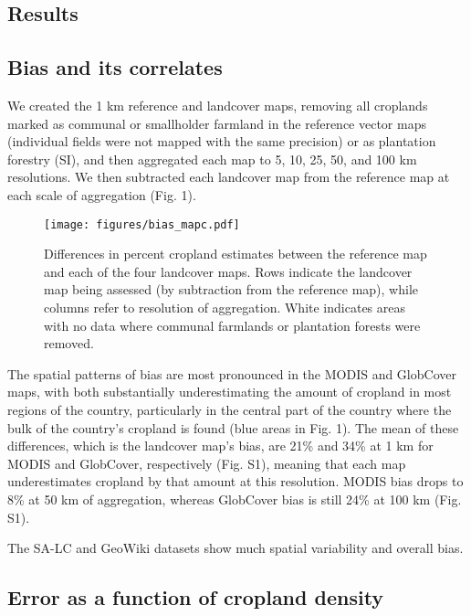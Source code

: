 \documentclass{pnastwo}
\begin{document}
\begin{article}
\vspace{-0.5 cm}
\section{Results}
\subsection{Bias and its correlates}

We created the 1 km reference and landcover maps, removing all croplands marked as communal or smallholder farmland in the reference vector maps (individual fields were not mapped with the same precision) or as plantation forestry (SI), and then aggregated each map to 5, 10, 25, 50, and 100 km resolutions. We then subtracted each landcover map from the reference map at each scale of aggregation (Fig. 1). 

\vspace{-0.25 cm}
\begin{figure}[ht]
\centerline{\texttt{[image: figures/bias\_mapc.pdf]}}
\caption{Differences in percent cropland estimates between the reference map and each of the four landcover maps. Rows indicate the landcover map being assessed (by subtraction from the reference map), while columns refer to resolution of aggregation. White indicates areas with no data where communal farmlands or plantation forests were removed.}\label{afoto}
\end{figure}

The spatial patterns of bias are most pronounced in the MODIS and GlobCover maps, with both substantially underestimating the amount of cropland in most regions of the country, particularly in the central part of the country where the bulk of the country's cropland is found (blue areas in Fig. 1). The mean of these differences, which is the landcover map's bias, are 21\% and 34\% at 1 km for MODIS and GlobCover, respectively (Fig. S1), meaning that each map underestimates cropland by that amount at this resolution. MODIS bias drops to 8\% at 50 km of aggregation, whereas GlobCover bias is still 24\% at 100 km (Fig. S1).   

The SA-LC and GeoWiki datasets show much spatial variability and overall bias.  

\subsection{Error as a function of cropland density}


\end{article}
\end{document}
